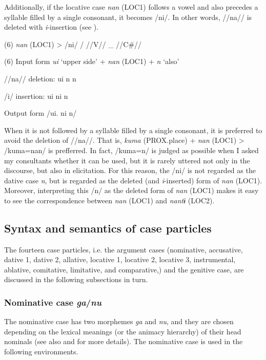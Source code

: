 Additionally, if the locative case \textit{nan} (LOC1) follows a vowel and also precedes a syllable filled by a single consonant, it becomes /ni/. In other words, //na// is deleted with \textit{i}{}-insertion (see ).

(6)  \textit{nan}  (LOC1)  >  /ni/  /  //V//  \_  //C\#//

(6)  Input form  \textit{ui}  ‘upper side’  +  \textit{nan}  (LOC1)  +  \textit{n}  ‘also’

  //na// deletion:  ui      n      n  

  /i/ insertion:  ui      ni      n  

  Output form  /ui.      ni      n/  

When it is not followed by a syllable filled by a single consonant, it is preferred to avoid the deletion of //na//. That is, \textit{kuma} (PROX.place) + \textit{nan} (LOC1) > /kuma=nan/ is prefferred. In fact, /kuma=n/ is judged as possible when I asked my consultants whether it can be used, but it is rarely uttered not only in the discourse, but also in elicitation. For this reason, the /ni/ is not regarded as the dative case \textit{n}, but is regarded as the deleted (and \textit{i}{}-inserted) form of \textit{nan} (LOC1). Moreover, interpreting this /n/ as the deleted form of \textit{nan} (LOC1) makes it easy to see the correspondence between \textit{nan} (LOC1) and \textit{nantɨ} (LOC2).

\subsection{Syntax and semantics of case particles}

The fourteen case particles, i.e. the argument cases (nominative, accusative, dative 1, dative 2, allative, locative 1, locative 2, locative 3, instrumental, ablative, comitative, limitative, and comparative,) and the genitive case, are discussed in the following subsections in turn.

\subsubsection{Nominative case \textit{ga}/\textit{nu}}
\label{bkm:Ref366360662}
The nominative case has two morphemes \textit{ga} and \textit{nu}, and they are chosen depending on the lexical meanings (or the animacy hierarchy) of their head nominals (see also  and  for more details). The nominative case is used in the following environments.

